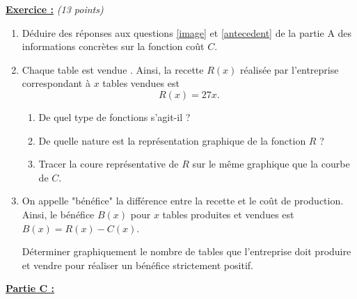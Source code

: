\documentclass[12pt,french]{book}
\renewenvironment{exo}[1]{%
  \refstepcounter{exo}\underline{\textbf{Exercice \theexo :}} \quad \textit{#1}\par
  \medskip}%
{\bigskip}
\begin{document}
\begin{exo}{(13 points)}
\begin{minipage}{0.5\textwidth}
        \begin{enumerate}
            \item Déduire des réponses aux questions \ref{image} et \ref{antecedent} de la partie A des informations concrètes sur la fonction coût $C$.
            \item Chaque table est vendue . Ainsi, la recette $R(x)$ réalisée par l'entreprise correspondant à $x$ tables vendues est \[R(x) = 27x.\]
            \begin{enumerate}
                \item De quel type de fonctions s'agit-il ?
                \item De quelle nature est la représentation graphique de la fonction $R$ ?
                \item Tracer la coure représentative de $R$ sur le même graphique que la courbe de $C$.
            \end{enumerate}
            \item On appelle "bénéfice" la différence entre la recette et le coût de production.
            Ainsi, le bénéfice $B(x)$ pour $x$ tables produites et vendues est $B(x) = R(x) - C(x)$.\par\medskip
            Déterminer graphiquement le nombre de tables que l'entreprise doit produire et vendre pour réaliser un bénéfice strictement positif.
        \end{enumerate}
    \end{minipage}\qquad
    \begin{minipage}{0.4\textwidth}
        \begin{center}
        \end{center}
    \end{minipage}

\medskip

    \underline{\textbf{Partie C :}}\medskip
    

\end{exo}
\end{document}
